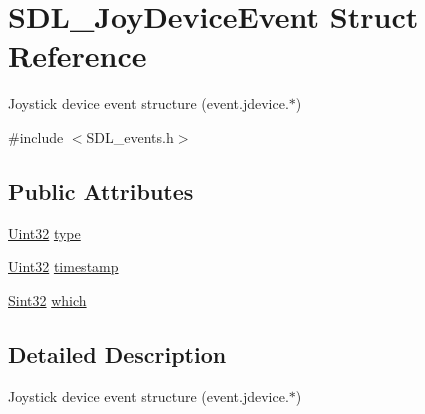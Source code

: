 \hypertarget{struct_s_d_l___joy_device_event}{\section{S\-D\-L\-\_\-\-Joy\-Device\-Event Struct Reference}
\label{struct_s_d_l___joy_device_event}
}


Joystick device event structure (event.\-jdevice.$\ast$)  




{\ttfamily \#include $<$S\-D\-L\-\_\-events.\-h$>$}

\subsection*{Public Attributes}
\begin{DoxyCompactItemize}
\item 
\hyperlink{_s_d_l__stdinc_8h_add440eff171ea5f55cb00c4a9ab8672d}{Uint32} \hyperlink{struct_s_d_l___joy_device_event_a51f060ba1dd5669b458e9c97aece667e}{type}
\item 
\hyperlink{_s_d_l__stdinc_8h_add440eff171ea5f55cb00c4a9ab8672d}{Uint32} \hyperlink{struct_s_d_l___joy_device_event_a5c4a9271bfff5d5c2e09a0dc732df8f3}{timestamp}
\item 
\hyperlink{_s_d_l__stdinc_8h_a7a90b941db9d4582e9ad7abb9940ff7e}{Sint32} \hyperlink{struct_s_d_l___joy_device_event_af9b295798f033b799ebbda7de6cb5a7e}{which}
\end{DoxyCompactItemize}


\subsection{Detailed Description}
Joystick device event structure (event.\-jdevice.$\ast$) 


